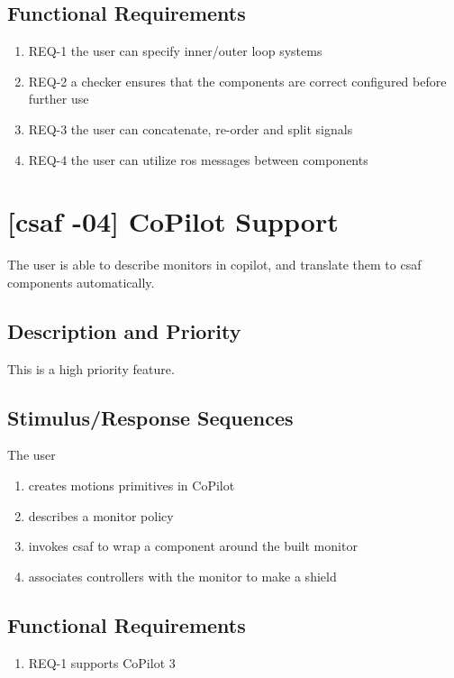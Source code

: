 \subsection{Functional Requirements}
\begin{enumerate}
\item REQ-1 \quad the user can specify inner/outer loop systems
\item REQ-2 \quad a checker ensures that the components are correct configured before further use
\item REQ-3 \quad the user can concatenate, re-order and split signals
\item REQ-4 \quad the user can utilize \acrshort{ros} messages between components
\end{enumerate}

\section{[\acrshort{csaf} -04] CoPilot Support}
The user is able to describe monitors in copilot, and translate them to \acrshort{csaf}  components automatically.

\subsection{Description and Priority}
This is a high priority feature.

\subsection{Stimulus/Response Sequences}
The user
\begin{enumerate}
\item creates motions primitives in CoPilot
\item describes a monitor policy 
\item  invokes \acrshort{csaf}  to wrap a component around the built monitor
\item associates controllers with the monitor to make a shield
\end{enumerate}

\subsection{Functional Requirements}
\begin{enumerate}
\item REQ-1 \quad supports CoPilot 3
\end{enumerate}

